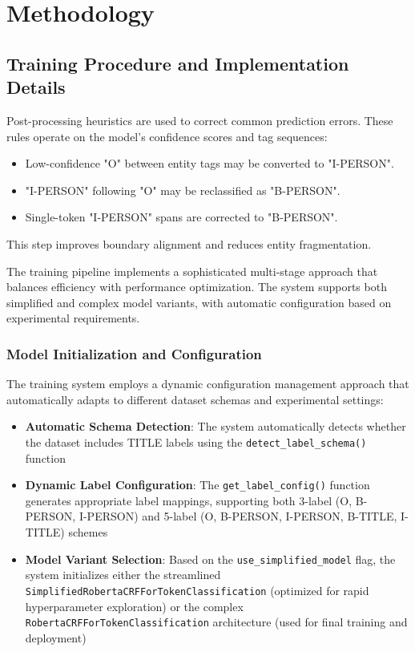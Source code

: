 \documentclass[a4paper]{usiinfbachelorproject}
\begin{document}
\section{Methodology}



\subsection{Training Procedure and Implementation Details}

Post-processing heuristics are used to correct common prediction errors. These rules operate on the model’s confidence scores and tag sequences:

\begin{itemize}
    \item Low-confidence "O" between entity tags may be converted to "I-PERSON".
    \item "I-PERSON" following "O" may be reclassified as "B-PERSON".
    \item Single-token "I-PERSON" spans are corrected to "B-PERSON".
\end{itemize}

This step improves boundary alignment and reduces entity fragmentation.

The training pipeline implements a sophisticated multi-stage approach that balances efficiency with performance optimization. The system supports both simplified and complex model variants, with automatic configuration based on experimental requirements.

\subsubsection{Model Initialization and Configuration}

The training system employs a dynamic configuration management approach that automatically adapts to different dataset schemas and experimental settings:

\begin{itemize}
    \item \textbf{Automatic Schema Detection}: The system automatically detects whether the dataset includes TITLE labels using the \texttt{detect\_label\_schema()} function
    \item \textbf{Dynamic Label Configuration}: The \texttt{get\_label\_config()} function generates appropriate label mappings, supporting both 3-label (O, B-PERSON, I-PERSON) and 5-label (O, B-PERSON, I-PERSON, B-TITLE, I-TITLE) schemes
    \item \textbf{Model Variant Selection}: Based on the \texttt{use\_simplified\_model} flag, the system initializes either the streamlined \texttt{SimplifiedRobertaCRFForTokenClassification} (optimized for rapid hyperparameter exploration) or the complex \texttt{RobertaCRFForTokenClassification} architecture (used for final training and deployment)
\end{itemize}
\end{document}
